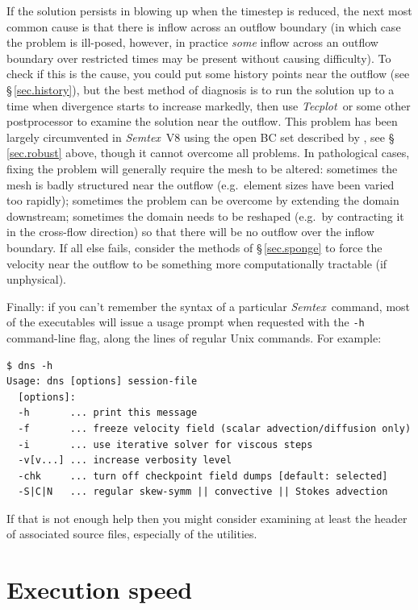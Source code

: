 \documentclass[11pt]{report}
\newcommand{\Semtex}{\emph{Semtex}} \newcommand{\Dog}{\emph{Dog}}
\newcommand{\Tecplot}{\emph{Tecplot}}
\newcommand{\eg}{e.g.\ } \newcommand{\CC}{\mathrm{c.c.}}
\begin{document}
If the solution persists in blowing up when the timestep is reduced,
the next most common cause is that there is inflow across an outflow
boundary (in which case the problem is ill-posed, however, in practice
\emph{some} inflow across an outflow boundary over restricted times
may be present without causing difficulty). To check if this is the
cause, you could put some history points near the outflow (see
\S\,\ref{sec.history}), but the best method of diagnosis is to run the
solution up to a time when divergence starts to increase markedly,
then use \Tecplot\ or some other postprocessor to examine the solution
near the outflow.  This problem has been largely circumvented in
\Semtex~V8 using the open BC set described by \citet{dong15}, see
\S\,\ref{sec.robust} above, though it cannot overcome all problems.
In pathological cases, fixing the problem will generally require the
mesh to be altered: sometimes the mesh is badly structured near the
outflow (\eg element sizes have been varied too rapidly); sometimes
the problem can be overcome by extending the domain downstream;
sometimes the domain needs to be reshaped (\eg by contracting it in
the cross-flow direction) so that there will be no outflow over the
inflow boundary. If all else fails, consider the methods of
\S\,\ref{sec.sponge} to force the velocity near the outflow to be
something more computationally tractable (if unphysical).

Finally: if you can't remember the syntax of a particular
\Semtex\ command, most of the executables will issue a usage prompt
when requested with the \verb|-h| command-line flag, along the lines
of regular Unix commands.  For example:
%
{\small
\begin{verbatim}
$ dns -h
Usage: dns [options] session-file
  [options]:
  -h       ... print this message
  -f       ... freeze velocity field (scalar advection/diffusion only)
  -i       ... use iterative solver for viscous steps
  -v[v...] ... increase verbosity level
  -chk     ... turn off checkpoint field dumps [default: selected]
  -S|C|N   ... regular skew-symm || convective || Stokes advection
\end{verbatim}
}
%
\noindent
If that is not enough help then you might consider examining at least
the header of associated source files, especially of the utilities.

\section{Execution speed}
\label{sec.speed}
\end{document}
